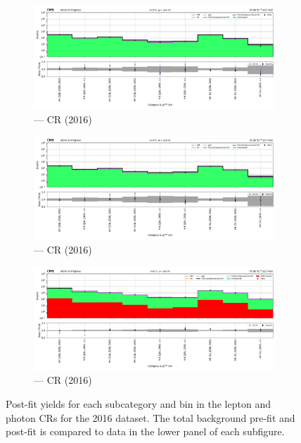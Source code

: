 \begin{figure}[htbp]
    \begin{subfigure}[b]{0.49\textwidth}
        \includegraphics[width=\textwidth]{chapters/higgstoinv/figures/mountain_ranges/2016/VH/Zmumu_tree_fit_s-abs_values_VH_cats.pdf}
        \caption{\VH --- \doubleMuCr \gls{CR} (2016)}
    \end{subfigure}
    \hfill
    \begin{subfigure}[b]{0.49\textwidth}
        \includegraphics[width=\textwidth]{chapters/higgstoinv/figures/mountain_ranges/2016/VH/Zee_tree_fit_s-abs_values_VH_cats.pdf}
        \caption{\VH --- \doubleEleCr \gls{CR} (2016)}
    \end{subfigure}

    \begin{subfigure}[b]{0.49\textwidth}
        \includegraphics[width=\textwidth]{chapters/higgstoinv/figures/mountain_ranges/2016/VH/Photon_tree_fit_s-abs_values_VH_cats.pdf}
        \caption{\VH --- \singlePhotonCr \gls{CR} (2016)}
    \end{subfigure}
    \caption[Post-fit yields for each \VH subcategory and \ptmiss bin in the lepton and photon control regions for the 2016 dataset]{Post-fit yields for each \VH subcategory and \ptmiss bin in the lepton and photon \glspl{CR} for the 2016 dataset. The total background pre-fit and post-fit is compared to data in the lower panel of each subfigure.}
    \label{fig:htoinv_mountain_range_VH_2016_CRs}
\end{figure}

